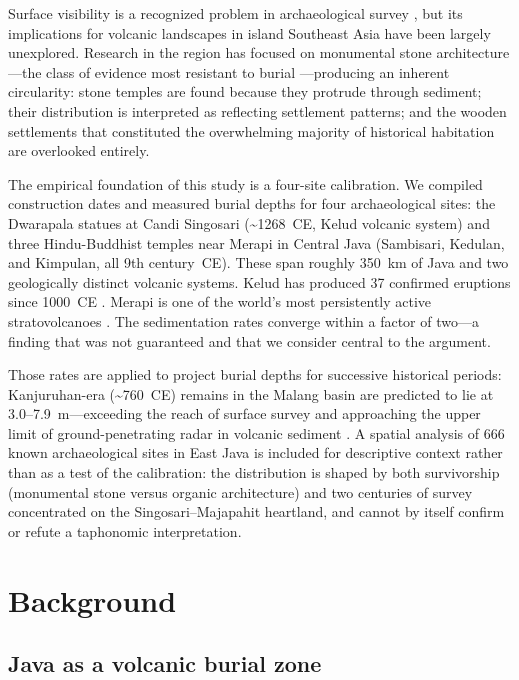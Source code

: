 \documentclass[12pt,a4paper]{article}
\begin{document}
Surface visibility is a recognized problem in archaeological survey \citep{wandsnider1992,french2003}, but its implications for volcanic landscapes in island Southeast Asia have been largely unexplored. Research in the region has focused on monumental stone architecture---the class of evidence most resistant to burial \citep{degroot2009}---producing an inherent circularity: stone temples are found because they protrude through sediment; their distribution is interpreted as reflecting settlement patterns; and the wooden settlements that constituted the overwhelming majority of historical habitation are overlooked entirely.

The empirical foundation of this study is a four-site calibration. We compiled construction dates and measured burial depths for four archaeological sites: the Dwarapala statues at Candi Singosari (\textasciitilde1268~CE, Kelud volcanic system) and three Hindu-Buddhist temples near Merapi in Central Java (Sambisari, Kedulan, and Kimpulan, all 9th century~CE). These span roughly 350~km of Java and two geologically distinct volcanic systems. Kelud has produced 37 confirmed eruptions since 1000~CE \citep{gvp2024}. Merapi is one of the world's most persistently active stratovolcanoes \citep{gertisser2012}. The sedimentation rates converge within a factor of two---a finding that was not guaranteed and that we consider central to the argument.

Those rates are applied to project burial depths for successive historical periods: Kanjuruhan-era (\textasciitilde760~CE) remains in the Malang basin are predicted to lie at 3.0--7.9~m---exceeding the reach of surface survey and approaching the upper limit of ground-penetrating radar in volcanic sediment \citep{putra2019,conyers2004}. A spatial analysis of 666 known archaeological sites in East Java is included for descriptive context rather than as a test of the calibration: the distribution is shaped by both survivorship (monumental stone versus organic architecture) and two centuries of survey concentrated on the Singosari--Majapahit heartland, and cannot by itself confirm or refute a taphonomic interpretation.


\section{Background}

\subsection{Java as a volcanic burial zone}
\end{document}
